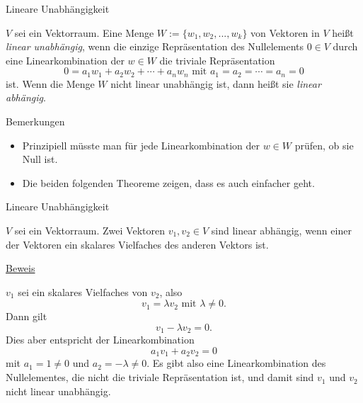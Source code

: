 \documentclass[
  8pt,
  ignorenonframetext,
]{beamer}
\providecommand{\tightlist}{%
  \setlength{\itemsep}{0pt}\setlength{\parskip}{0pt}}
\begin{document}
\begin{frame}{Lineare Unabhängigkeit}
\protect\hypertarget{lineare-unabhuxe4ngigkeit-1}{}
\small
\begin{definition}
\justifying
$V$ sei ein Vektorraum. Eine Menge $W := \{w_1, w_2, ...,w_k\}$ von Vektoren in $V$ heißt
\textit{linear unabhängig}, wenn die einzige Repräsentation des Nullelements
$0 \in V$ durch eine Linearkombination der $w \in W$ die triviale
Repräsentation
\begin{equation}
0 = a_1 w_1 + a_2 w_2 + \cdots + a_n w_n \mbox{ mit } a_1 = a_2 =  \cdots = a_n = 0
\end{equation}
ist. Wenn die Menge $W$ nicht linear unabhängig ist, dann heißt sie \textit{linear abhängig}.
\end{definition}

Bemerkungen

\begin{itemize}
\tightlist
\item
  Prinzipiell müsste man für jede Linearkombination der \(w \in W\)
  prüfen, ob sie Null ist.
\item
  Die beiden folgenden Theoreme zeigen, dass es auch einfacher geht.
\end{itemize}
\end{frame}

\begin{frame}{Lineare Unabhängigkeit}
\protect\hypertarget{lineare-unabhuxe4ngigkeit-2}{}
\small
\begin{theorem}
\justifying
\normalfont
$V$ sei ein Vektorraum. Zwei Vektoren $v_1, v_2 \in V$ sind linear abhängig,
wenn einer der Vektoren ein skalares Vielfaches des anderen Vektors ist.
\end{theorem}
\footnotesize

\underline{Beweis} \vspace{1mm}

\(v_1\) sei ein skalares Vielfaches von \(v_2\), also \begin{equation}
v_1 = \lambda v_2 \mbox{ mit } \lambda \neq 0.
\end{equation} Dann gilt \begin{equation}
v_1 - \lambda v_2 = 0.
\end{equation} Dies aber entspricht der Linearkombination
\begin{equation}
a_1v_1 + a_2v_2 = 0
\end{equation} mit \(a_1 = 1 \neq 0\) und \(a_2 = -\lambda \neq 0\). Es
gibt also eine Linearkombination des Nullelementes, die nicht die
triviale Repräsentation ist, und damit sind \(v_1\) und \(v_2\) nicht
linear unabhängig.
\end{frame}
\end{document}
